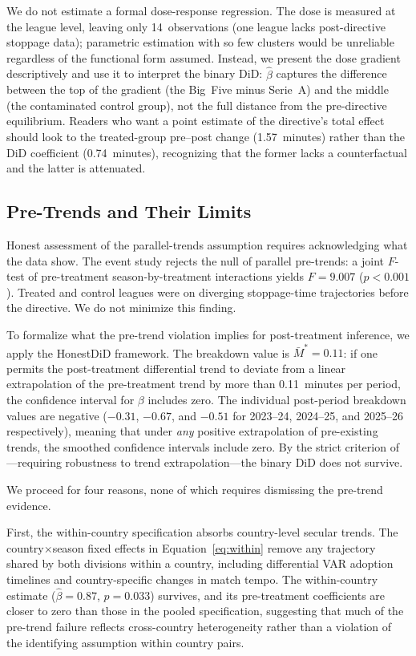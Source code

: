 We do not estimate a formal dose-response regression. The dose is
measured at the league level, leaving only 14~observations (one
league lacks post-directive stoppage data); parametric estimation
with so few clusters would be unreliable regardless of the functional
form assumed. Instead, we present the dose gradient descriptively
and use it to interpret the binary DiD: $\hat{\beta}$ captures the
difference between the top of the gradient (the Big~Five minus
Serie~A) and the middle (the contaminated control group), not the
full distance from the pre-directive equilibrium. Readers who want
a point estimate of the directive's total effect should look to the
treated-group pre--post change (1.57~minutes) rather than the DiD
coefficient (0.74~minutes), recognizing that the former lacks a
counterfactual and the latter is attenuated.

\subsection{Pre-Trends and Their Limits}

Honest assessment of the parallel-trends assumption requires
acknowledging what the data show. The event study rejects the null
of parallel pre-trends: a joint $F$-test of pre-treatment
season-by-treatment interactions yields $F = 9.007$ ($p < 0.001$).
Treated and control leagues were on diverging stoppage-time
trajectories before the directive. We do not minimize this finding.

To formalize what the pre-trend violation implies for post-treatment
inference, we apply the \citet{rambachan2023more} HonestDiD
framework. The breakdown value is $\bar{M}^* = 0.11$: if one
permits the post-treatment differential trend to deviate from a
linear extrapolation of the pre-treatment trend by more than
0.11~minutes per period, the confidence interval for $\beta$
includes zero. The individual post-period breakdown values are
negative ($-0.31$, $-0.67$, and $-0.51$ for 2023--24, 2024--25,
and 2025--26 respectively), meaning that under \textit{any}
positive extrapolation of pre-existing trends, the smoothed
confidence intervals include zero. By the strict criterion of
\citet{roth2022pretest}---requiring robustness to trend
extrapolation---the binary DiD does not survive.

We proceed for four reasons, none of which requires dismissing the
pre-trend evidence.

First, the within-country specification absorbs country-level secular
trends. The country$\times$season fixed effects in
Equation~\ref{eq:within} remove any trajectory shared by both
divisions within a country, including differential VAR adoption
timelines and country-specific changes in match tempo. The
within-country estimate ($\hat{\beta} = 0.87$, $p = 0.033$)
survives, and its pre-treatment coefficients are closer to zero than
those in the pooled specification, suggesting that much of the
pre-trend failure reflects cross-country heterogeneity rather than
a violation of the identifying assumption within country pairs.

